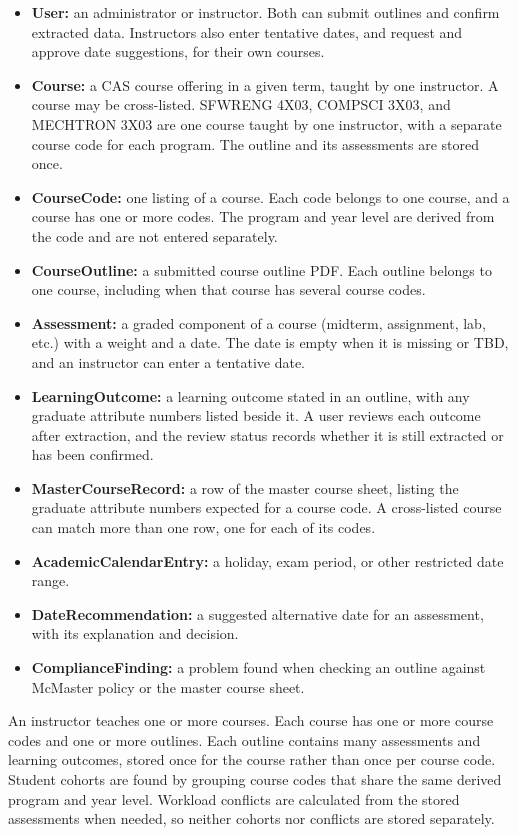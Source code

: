 \documentclass[12pt]{article}
\begin{document}
\begin{itemize}
\item \textbf{User:} an administrator or instructor. Both can submit outlines and confirm extracted data. Instructors also enter tentative dates, and request and approve date suggestions, for their own courses.
\item \textbf{Course:} a CAS course offering in a given term, taught by one instructor. A course may be cross-listed. SFWRENG 4X03, COMPSCI 3X03, and MECHTRON 3X03 are one course taught by one instructor, with a separate course code for each program. The outline and its assessments are stored once.
\item \textbf{CourseCode:} one listing of a course. Each code belongs to one course, and a course has one or more codes. The program and year level are derived from the code and are not entered separately.
\item \textbf{CourseOutline:} a submitted course outline PDF. Each outline belongs to one course, including when that course has several course codes.
\item \textbf{Assessment:} a graded component of a course (midterm, assignment, lab, etc.) with a weight and a date. The date is empty when it is missing or TBD, and an instructor can enter a tentative date.
\item \textbf{LearningOutcome:} a learning outcome stated in an outline, with any graduate attribute numbers listed beside it. A user reviews each outcome after extraction, and the review status records whether it is still extracted or has been confirmed.
\item \textbf{MasterCourseRecord:} a row of the master course sheet, listing the graduate attribute numbers expected for a course code. A cross-listed course can match more than one row, one for each of its codes.
\item \textbf{AcademicCalendarEntry:} a holiday, exam period, or other restricted date range.
\item \textbf{DateRecommendation:} a suggested alternative date for an assessment, with its explanation and decision.
\item \textbf{ComplianceFinding:} a problem found when checking an outline against McMaster policy or the master course sheet.
\end{itemize}

\noindent An instructor teaches one or more courses. Each course has one or more course codes and one or more outlines. Each outline contains many assessments and learning outcomes, stored once for the course rather than once per course code. Student cohorts are found by grouping course codes that share the same derived program and year level. Workload conflicts are calculated from the stored assessments when needed, so neither cohorts nor conflicts are stored separately.
\end{document}

